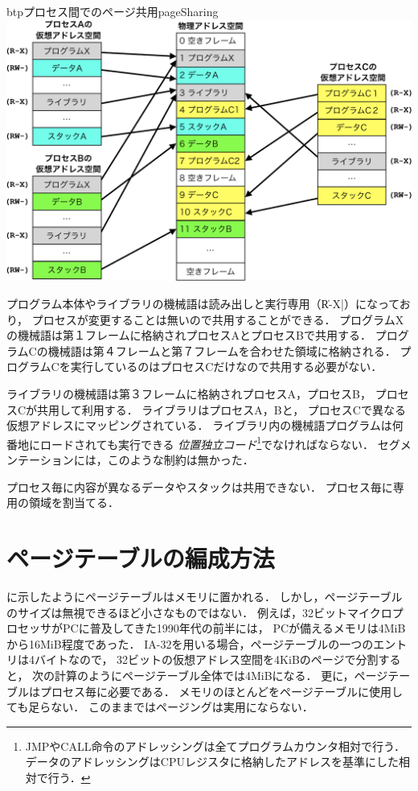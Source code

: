 \begin{myfig}{btp}{プロセス間でのページ共用}{pageSharing}
  \includegraphics[scale=0.66]{Fig/pageSharing-crop.pdf}
\end{myfig}

プログラム本体やライブラリの機械語は読み出しと実行専用（\|R-X|）になっており，
プロセスが変更することは無いので共用することができる．
プログラムXの機械語は第１フレームに格納されプロセスAとプロセスBで共用する．
プログラムCの機械語は第４フレームと第７フレームを合わせた領域に格納される．
プログラムCを実行しているのはプロセスCだけなので共用する必要がない．

ライブラリの機械語は第３フレームに格納されプロセスA，プロセスB，
プロセスCが共用して利用する．
ライブラリはプロセスA，Bと，
プロセスCで異なる仮想アドレスにマッピングされている．
ライブラリ内の機械語プログラムは何番地にロードされても実行できる
\emph{位置独立コード}\footnote{
  JMPやCALL命令のアドレッシングは全てプログラムカウンタ相対で行う．
  データのアドレッシングはCPUレジスタに格納したアドレスを基準にした相対で行う．
}でなければならない．
セグメンテーションには，このような制約は無かった．

プロセス毎に内容が異なるデータやスタックは共用できない．
プロセス毎に専用の領域を割当てる．

\section{ページテーブルの編成方法}
に示したようにページテーブルはメモリに置かれる．
しかし，ページテーブルのサイズは無視できるほど小さなものではない．
例えば，32ビットマイクロプロセッサがPCに普及してきた1990年代の前半には，
PCが備えるメモリは4MiBから16MiB程度であった．
IA-32を用いる場合，ページテーブルの一つのエントリは4バイトなので，
32ビットの仮想アドレス空間を4KiBのページで分割すると，
次の計算のようにページテーブル全体では4MiBになる．
更に，ページテーブルはプロセス毎に必要である．
メモリのほとんどをページテーブルに使用しても足らない．
このままではページングは実用にならない．

